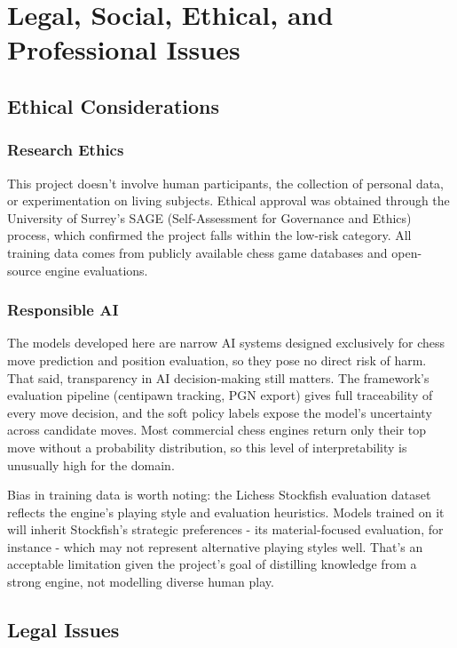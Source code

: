 \chapter{Legal, Social, Ethical, and Professional Issues}

\section{Ethical Considerations}

\subsection{Research Ethics}
This project doesn't involve human participants, the collection of personal data, or experimentation on living subjects. Ethical approval was obtained through the University of Surrey's SAGE (Self-Assessment for Governance and Ethics) process, which confirmed the project falls within the low-risk category. All training data comes from publicly available chess game databases and open-source engine evaluations.

\subsection{Responsible AI}
The models developed here are narrow AI systems designed exclusively for chess move prediction and position evaluation, so they pose no direct risk of harm. That said, transparency in AI decision-making still matters. The framework's evaluation pipeline (centipawn tracking, PGN export) gives full traceability of every move decision, and the soft policy labels expose the model's uncertainty across candidate moves. Most commercial chess engines return only their top move without a probability distribution, so this level of interpretability is unusually high for the domain.

Bias in training data is worth noting: the Lichess Stockfish evaluation dataset reflects the engine's playing style and evaluation heuristics. Models trained on it will inherit Stockfish's strategic preferences - its material-focused evaluation, for instance - which may not represent alternative playing styles well. That's an acceptable limitation given the project's goal of distilling knowledge from a strong engine, not modelling diverse human play.

\section{Legal Issues}

